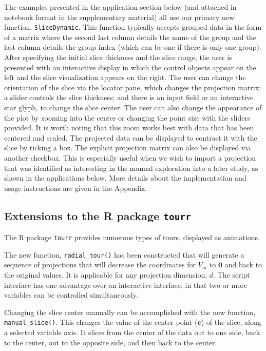 \documentclass[]{interact}
\theoremstyle{plain}%
\theoremstyle{definition}
\theoremstyle{remark}
\begin{document}
The examples presented in the application section below (and attached in
notebook format in the supplementary material) all use our primary new
function, \texttt{SliceDynamic}. This function typically accepts grouped
data in the form of a matrix where the second last column details the
name of the group and the last column details the group index (which can
be one if there is only one group). After specifying the initial slice
thickness and the slice range, the user is presented with an interactive
display in which the control objects appear on the left and the slice
visualization appears on the right. The user can change the orientation
of the slice via the locator pane, which changes the projection matrix;
a slider controls the slice thickness; and there is an input field or an
interactive star glyph, to change the slice center. The user can also
change the appearance of the plot by zooming into the center or changing
the point size with the sliders provided. It is worth noting that this
zoom works best with data that has been centered and scaled. The
projected data can be displayed to contrast it with the slice by ticking
a box. The explicit projection matrix can also be displayed via another
checkbox. This is especially useful when we wish to import a projection
that was identified as interesting in the manual exploration into a
later study, as shown in the applications below. More details about the
implementation and usage instructions are given in the Appendix.

\hypertarget{extensions-to-the-r-package-tourr}{%
\subsection{\texorpdfstring{Extensions to the R package
\texttt{tourr}}{Extensions to the R package tourr}}\label{extensions-to-the-r-package-tourr}}

The R package \texttt{tourr} provides numerous types of tours, displayed
as animations.

The new function, \texttt{radial\_tour()} has been constructed that will
generate a sequence of projections that will decrease the coordinates
for \(V_m\) to \(\boldsymbol{0}\) and back to the original values. It is
applicable for any projection dimension, \(d\). The script interface has
one advantage over an interactive interface, in that two or more
variables can be controlled simultaneously.

Changing the slice center manually can be accomplished with the new
function, \texttt{manual\_slice()}. This changes the value of the center
point (\(\mathbf{c}\)) of the slice, along a selected variable axis. It
slices from the center of the data out to one side, back to the center,
out to the opposite side, and then back to the center.
\end{document}
